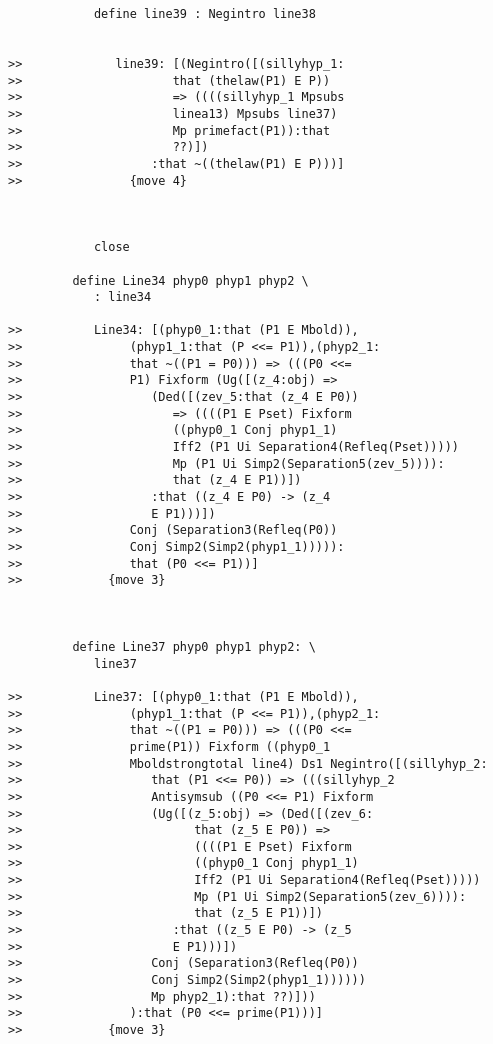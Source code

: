 \documentclass[12pt]{article}
\begin{document}
\begin{verbatim}
            define line39 : Negintro line38


>>             line39: [(Negintro([(sillyhyp_1:
>>                     that (thelaw(P1) E P))
>>                     => ((((sillyhyp_1 Mpsubs
>>                     linea13) Mpsubs line37)
>>                     Mp primefact(P1)):that
>>                     ??)])
>>                  :that ~((thelaw(P1) E P)))]
>>               {move 4}



            close

         define Line34 phyp0 phyp1 phyp2 \
            : line34

>>          Line34: [(phyp0_1:that (P1 E Mbold)),
>>               (phyp1_1:that (P <<= P1)),(phyp2_1:
>>               that ~((P1 = P0))) => (((P0 <<=
>>               P1) Fixform (Ug([(z_4:obj) =>
>>                  (Ded([(zev_5:that (z_4 E P0))
>>                     => ((((P1 E Pset) Fixform
>>                     ((phyp0_1 Conj phyp1_1)
>>                     Iff2 (P1 Ui Separation4(Refleq(Pset)))))
>>                     Mp (P1 Ui Simp2(Separation5(zev_5)))):
>>                     that (z_4 E P1))])
>>                  :that ((z_4 E P0) -> (z_4
>>                  E P1)))])
>>               Conj (Separation3(Refleq(P0))
>>               Conj Simp2(Simp2(phyp1_1))))):
>>               that (P0 <<= P1))]
>>            {move 3}



         define Line37 phyp0 phyp1 phyp2: \
            line37

>>          Line37: [(phyp0_1:that (P1 E Mbold)),
>>               (phyp1_1:that (P <<= P1)),(phyp2_1:
>>               that ~((P1 = P0))) => (((P0 <<=
>>               prime(P1)) Fixform ((phyp0_1
>>               Mboldstrongtotal line4) Ds1 Negintro([(sillyhyp_2:
>>                  that (P1 <<= P0)) => (((sillyhyp_2
>>                  Antisymsub ((P0 <<= P1) Fixform
>>                  (Ug([(z_5:obj) => (Ded([(zev_6:
>>                        that (z_5 E P0)) =>
>>                        ((((P1 E Pset) Fixform
>>                        ((phyp0_1 Conj phyp1_1)
>>                        Iff2 (P1 Ui Separation4(Refleq(Pset)))))
>>                        Mp (P1 Ui Simp2(Separation5(zev_6)))):
>>                        that (z_5 E P1))])
>>                     :that ((z_5 E P0) -> (z_5
>>                     E P1)))])
>>                  Conj (Separation3(Refleq(P0))
>>                  Conj Simp2(Simp2(phyp1_1))))))
>>                  Mp phyp2_1):that ??)]))
>>               ):that (P0 <<= prime(P1)))]
>>            {move 3}




\end{verbatim}
\end{document}
